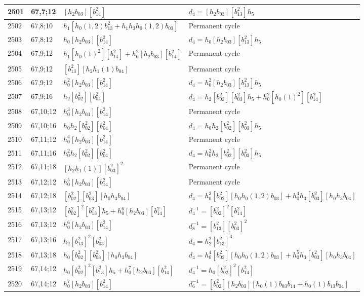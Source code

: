 \documentclass{article}
\begin{document}
\begin{longtable}{|l|l|>{\raggedright\arraybackslash}p{6cm}|>{\raggedright\arraybackslash}p{6cm}|}
\hline
2501 & 67,7;12 & $[h_2b_{03}][b_{14}^2]$ &$d_{4}=[h_2b_{03}][b_{13}^2]h_5$\\
\hline
2502 & 67,8;10 & $h_1[h_0(1, 2)b_{13}^2 + h_1h_3h_0(1, 2)b_{03}]$ & Permanent cycle\\
\hline
2503 & 67,8;12 & $h_0[h_2b_{03}][b_{14}^2]$ &$d_{4}=h_0[h_2b_{03}][b_{13}^2]h_5$\\
\hline
2504 & 67,9;12 & $h_1[h_0(1)^2][b_{14}^2] + h_0^2[h_2b_{03}][b_{14}^2]$ & Permanent cycle\\
2505 & 67,9;12 & $[b_{13}^2][h_2h_1(1)b_{04}]$ & Permanent cycle\\
2506 & 67,9;12 & $h_0^2[h_2b_{03}][b_{14}^2]$ &$d_{4}=h_0^2[h_2b_{03}][b_{13}^2]h_5$\\
\hline
2507 & 67,9;16 & $h_2[b_{02}^2][b_{04}^2]$ &$d_{4}=h_2[b_{02}^2][b_{03}^2]h_5 + h_0^2[h_0(1)^2][b_{14}^2]$\\
\hline
2508 & 67,10;12 & $h_0^3[h_2b_{03}][b_{14}^2]$ & Permanent cycle\\
\hline
2509 & 67,10;16 & $h_0h_2[b_{02}^2][b_{04}^2]$ &$d_{4}=h_0h_2[b_{02}^2][b_{03}^2]h_5$\\
\hline
2510 & 67,11;12 & $h_0^4[h_2b_{03}][b_{14}^2]$ & Permanent cycle\\
\hline
2511 & 67,11;16 & $h_0^2h_2[b_{02}^2][b_{04}^2]$ &$d_{4}=h_0^2h_2[b_{02}^2][b_{03}^2]h_5$\\
\hline
2512 & 67,11;18 & $[h_2h_1(1)][b_{03}^2]^2$ & Permanent cycle\\
\hline
2513 & 67,12;12 & $h_0^5[h_2b_{03}][b_{14}^2]$ & Permanent cycle\\
\hline
2514 & 67,12;18 & $[b_{02}^2][b_{03}^2][h_0h_3b_{04}]$ &$d_{4}=h_0^3[b_{02}^2][h_0h_0(1, 2)b_{03}] + h_0^4h_3[b_{03}^2][h_0h_3b_{04}]$\\
\hline
2515 & 67,13;12 & $[b_{02}^2]^2[b_{13}^2]h_5 + h_0^6[h_2b_{03}][b_{14}^2]$ & $d_{4}^{-1}=[b_{02}^2]^2[b_{14}^2]$\\
2516 & 67,13;12 & $h_0^6[h_2b_{03}][b_{14}^2]$ & $d_{8}^{-1}=[b_{13}^2][b_{03}^2]^2$\\
\hline
2517 & 67,13;16 & $h_2[b_{13}^2]^2[b_{03}^2]$ &$d_{4}=h_2^2[b_{13}^2]^3$\\
\hline
2518 & 67,13;18 & $h_0[b_{02}^2][b_{03}^2][h_0h_3b_{04}]$ &$d_{4}=h_0^4[b_{02}^2][h_0h_0(1, 2)b_{03}] + h_0^5h_3[b_{03}^2][h_0h_3b_{04}]$\\
\hline
2519 & 67,14;12 & $h_0[b_{02}^2]^2[b_{13}^2]h_5 + h_0^7[h_2b_{03}][b_{14}^2]$ & $d_{4}^{-1}=h_0[b_{02}^2]^2[b_{14}^2]$\\
2520 & 67,14;12 & $h_0^7[h_2b_{03}][b_{14}^2]$ & $d_{6}^{-1}=[b_{02}^2][h_2b_{03}][h_0(1)b_{03}b_{14} + h_0(1)b_{13}b_{04}]$\\

\end{longtable}
\end{document}
